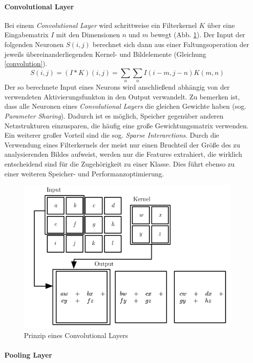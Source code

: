\paragraph{Convolutional Layer}
Bei einem \textit{Convolutional Layer} wird schrittweise ein Filterkernel $K$ über eine Eingabematrix $I$ mit den Dimensionen $n$ und $m$ bewegt (Abb. \ref{cnns}). Der Input der folgenden  Neuronen $S(i,j)$ berechnet sich dann aus einer Faltungsoperation der jeweils übereinanderliegenden Kernel- und Bildelemente (Gleichung \ref{convolution}). 
\begin{equation}\label{convolution}
	S(i,j)=(I\ast K)(i,j)=\sum_{n}\sum_{n} I(i-m,j-n)K(m,n)
\end{equation}
Der so berechnete Input eines Neurons wird anschließend abhängig von der verwendeten Aktivierungsfunkton in den Output verwandelt. Zu bemerken ist, dass alle Neuronen eines \textit{Convolutional Layers} die gleichen Gewichte haben (sog. \textit{Parameter Sharing}). Dadurch ist es möglich, Speicher gegenüber anderen Netzstrukturen einzusparen, die häufig eine große Gewichtungsmatrix verwenden. Ein weiterer großer Vorteil sind die sog. \textit{Sparse Interarctions}. Durch die Verwendung eines Filterkernels der meist nur einen Bruchteil der Größe des zu analysierenden Bildes aufweist, werden nur die Features extrahiert, die wirklich entscheidend sind für die Zugehörigkeit zu einer Klasse. Dies führt ebenso zu einer weiteren Speicher- und Performanzoptimierung.
\begin{figure}[h!]
  \centering
  \includegraphics[width=12cm]{cnn_prinzip.png}
  \caption{Prinzip eines Convolutional Layers \cite[S.330]{Goodfellow-et-al-2016}}
  \label{cnns}
\end{figure}
\paragraph{Pooling Layer}

